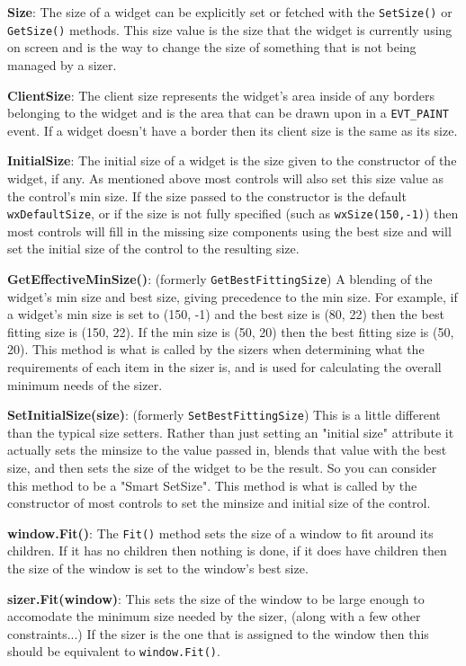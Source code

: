 {\bf Size}: The size of a widget can be explicitly set or fetched with
the \texttt{SetSize()} or \texttt{GetSize()} methods. This size value
is the size that the widget is currently using on screen and is the
way to change the size of something that is not being managed by a
sizer.

{\bf ClientSize}: The client size represents the widget's area inside
of any borders belonging to the widget and is the area that can be
drawn upon in a \texttt{EVT\_PAINT} event. If a widget doesn't have a
border then its client size is the same as its size.

{\bf InitialSize}: The initial size of a widget is the size given to
the constructor of the widget, if any.  As mentioned above most
controls will also set this size value as the control's min size. If
the size passed to the constructor is the default
\texttt{wxDefaultSize}, or if the size is not fully specified (such as
\texttt{wxSize(150,-1)}) then most controls will fill in the missing
size components using the best size and will set the initial size of
the control to the resulting size.

{\bf GetEffectiveMinSize()}: (formerly \texttt{GetBestFittingSize}) A
blending of the widget's min size and best size, giving precedence to
the min size. For example, if a widget's min size is set to (150, -1)
and the best size is (80, 22) then the best fitting size is (150,
22). If the min size is (50, 20) then the best fitting size is (50,
20). This method is what is called by the sizers when determining what
the requirements of each item in the sizer is, and is used for
calculating the overall minimum needs of the sizer.

{\bf SetInitialSize(size)}: (formerly \texttt{SetBestFittingSize})
This is a little different than the typical size setters. Rather than
just setting an "initial size" attribute it actually sets the minsize
to the value passed in, blends that value with the best size, and then
sets the size of the widget to be the result. So you can consider this
method to be a "Smart SetSize". This method is what is called by the
constructor of most controls to set the minsize and initial size of
the control.

{\bf window.Fit()}: The \texttt{Fit()} method sets the size of a
window to fit around its children. If it has no children then nothing
is done, if it does have children then the size of the window is set
to the window's best size.

{\bf sizer.Fit(window)}: This sets the size of the window to be large
enough to accomodate the minimum size needed by the sizer, (along with
a few other constraints...) If the sizer is the one that is assigned
to the window then this should be equivalent to \texttt{window.Fit()}.

